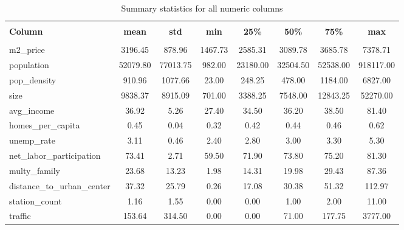 
    \begin{table}
      \centering 
      \caption{Summary statistics for all numeric columns} 
      \vspace{10pt}
      \label{tab:summary_statistics} 
      \begin{tabular}{@{\extracolsep{5pt}} lccccccc} 
      \hline 
      \hline \\[-1.8ex] 
      \textbf{Column} & \textbf{mean} & \textbf{std} & \textbf{min} & \textbf{25\%} & \textbf{50\%} & \textbf{75\%} & \textbf{max} \\ 
      \hline \\[-1.8ex] 
    m2\_price & 3196.45 & 878.96 & 1467.73 & 2585.31 & 3089.78 & 3685.78 & 7378.71 \\ 
population & 52079.80 & 77013.75 & 982.00 & 23180.00 & 32504.50 & 52538.00 & 918117.00 \\ 
pop\_density & 910.96 & 1077.66 & 23.00 & 248.25 & 478.00 & 1184.00 & 6827.00 \\ 
size & 9838.37 & 8915.09 & 701.00 & 3388.25 & 7548.00 & 12843.25 & 52270.00 \\ 
avg\_income & 36.92 & 5.26 & 27.40 & 34.50 & 36.20 & 38.50 & 81.40 \\ 
homes\_per\_capita & 0.45 & 0.04 & 0.32 & 0.42 & 0.44 & 0.46 & 0.62 \\ 
unemp\_rate & 3.11 & 0.46 & 2.40 & 2.80 & 3.00 & 3.30 & 5.30 \\ 
net\_labor\_participation & 73.41 & 2.71 & 59.50 & 71.90 & 73.80 & 75.20 & 81.30 \\ 
multy\_family & 23.68 & 13.23 & 1.98 & 14.31 & 19.98 & 29.43 & 87.36 \\ 
distance\_to\_urban\_center & 37.32 & 25.79 & 0.26 & 17.08 & 30.38 & 51.32 & 112.97 \\ 
station\_count & 1.16 & 1.55 & 0.00 & 0.00 & 1.00 & 2.00 & 11.00 \\ 
traffic & 153.64 & 314.50 & 0.00 & 0.00 & 71.00 & 177.75 & 3777.00 \\ 

      \hline 
      \hline 
      \end{tabular} 
    \end{table} 
    